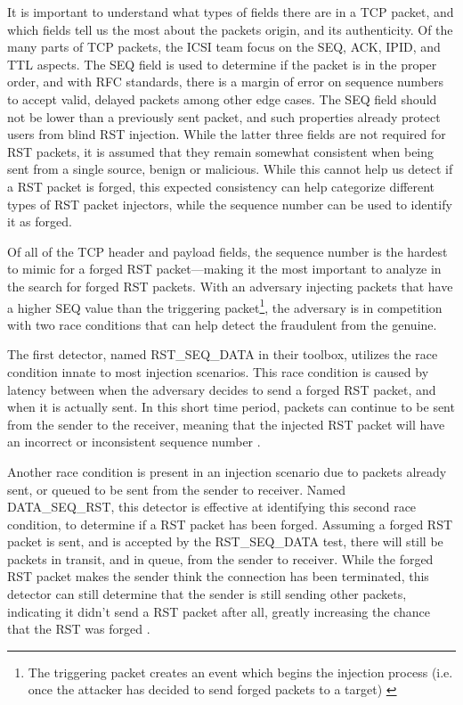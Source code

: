 \documentclass[journal]{IEEEtran}
\begin{document}
It is important to understand what types of fields there are in a TCP packet, and which fields tell us the most about the packets origin, and its authenticity. Of the many parts of TCP packets, the ICSI team focus on the SEQ, ACK, IPID, and TTL aspects. The SEQ field is used to determine if the packet is in the proper order, and with RFC standards, there is a margin of error on sequence numbers to accept valid, delayed packets among other edge cases. The SEQ field should not be lower than a previously sent packet, and such properties already protect users from blind RST injection. While the latter three fields are not required for RST packets, it is assumed that they remain somewhat consistent when being sent from a single source, benign or malicious. While this cannot help us detect if a RST packet is forged, this expected consistency can help categorize different types of RST packet injectors, while the sequence number can be used to identify it as forged.

Of all of the TCP header and payload fields, the sequence number is the hardest to mimic for a forged RST packet---making it the most important to analyze in the search for forged RST packets. With an adversary injecting packets that have a higher SEQ value than the triggering packet\footnote{The triggering packet creates an event which begins the injection process (i.e. once the attacker has decided to send forged packets to a target) \cite{rstdetection}}, the adversary is in competition with two race conditions that can help detect the fraudulent from the genuine.  

The first detector, named RST\_SEQ\_DATA in their toolbox, utilizes the race condition innate to most injection scenarios. This race condition is caused by latency between when the adversary decides to send a forged RST packet, and when it is actually sent. In this short time period, packets can continue to be sent from the sender to the receiver, meaning that the injected RST packet will have an incorrect or inconsistent sequence number \cite{rstdetection}.

Another race condition is present in an injection scenario due to packets already sent, or queued to be sent from the sender to receiver. Named DATA\_SEQ\_RST, this detector is effective at identifying this second race condition, to determine if a RST packet has been forged. Assuming a forged RST packet is sent, and is accepted by the RST\_SEQ\_DATA test, there will still be packets in transit, and in queue, from the sender to receiver. While the forged RST packet makes the sender think the connection has been terminated, this detector can still determine that the sender is still sending other packets, indicating it didn't send a RST packet after all, greatly increasing the chance that the RST was forged \cite{rstdetection}.
\end{document}
